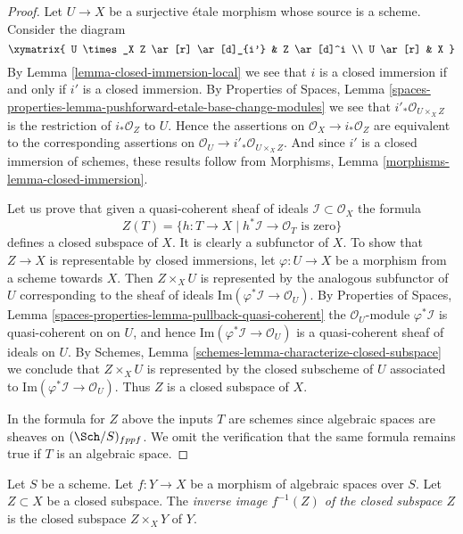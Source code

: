 \begin{proof}
Let $U \to X$ be a surjective \'etale morphism whose source is a scheme.
Consider the diagram
$$
\xymatrix{
U \times_X Z \ar[r] \ar[d]_{i'} & Z \ar[d]^i \\
U \ar[r] & X
}
$$
By
Lemma \ref{lemma-closed-immersion-local}
we see that $i$ is a closed immersion
if and only if $i'$ is a closed immersion. By
Properties of Spaces,
Lemma \ref{spaces-properties-lemma-pushforward-etale-base-change-modules}
we see that $i'_*\mathcal{O}_{U \times_X Z}$ is the restriction of
$i_*\mathcal{O}_Z$ to $U$. Hence the assertions on
$\mathcal{O}_X \to i_*\mathcal{O}_Z$ are equivalent to the
corresponding assertions on
$\mathcal{O}_U \to i'_*\mathcal{O}_{U \times_X Z}$.
And since $i'$ is a closed immersion of schemes, these results follow from
Morphisms, Lemma \ref{morphisms-lemma-closed-immersion}.

\medskip\noindent
Let us prove that given a quasi-coherent
sheaf of ideals $\mathcal{I} \subset \mathcal{O}_X$ the formula
$$
Z(T) = \{h : T \to X \mid h^*\mathcal{I} \to \mathcal{O}_T
\text{ is zero}\}
$$
defines a closed subspace of $X$. It is clearly a subfunctor of $X$.
To show that $Z \to X$ is representable by closed immersions, let
$\varphi : U \to X$ be a morphism from a scheme towards $X$. Then
$Z \times_X U$ is represented by the analogous subfunctor of $U$ corresponding
to the sheaf of ideals $\text{Im}(\varphi^*\mathcal{I} \to \mathcal{O}_U)$. By
Properties of Spaces,
Lemma \ref{spaces-properties-lemma-pullback-quasi-coherent}
the $\mathcal{O}_U$-module $\varphi^*\mathcal{I}$ is quasi-coherent on
on $U$, and hence $\text{Im}(\varphi^*\mathcal{I} \to \mathcal{O}_U)$
is a quasi-coherent sheaf of ideals on $U$. By
Schemes, Lemma \ref{schemes-lemma-characterize-closed-subspace}
we conclude that $Z \times_X U$ is represented by the closed subscheme
of $U$ associated to $\text{Im}(\varphi^*\mathcal{I} \to \mathcal{O}_U)$.
Thus $Z$ is a closed subspace of $X$.

\medskip\noindent
In the formula for $Z$ above the inputs $T$ are schemes since algebraic
spaces are sheaves on $(\Sch/S)_{fppf}$. We omit the verification
that the same formula remains true if $T$ is an algebraic space.
\end{proof}

\begin{definition}
\label{definition-inverse-image-closed-subspace}
Let $S$ be a scheme. Let $f : Y \to X$ be a morphism of algebraic spaces
over $S$. Let $Z \subset X$ be a closed subspace. The
{\it inverse image $f^{-1}(Z)$ of the closed subspace $Z$}
is the closed subspace $Z \times_X Y$ of $Y$.
\end{definition}

